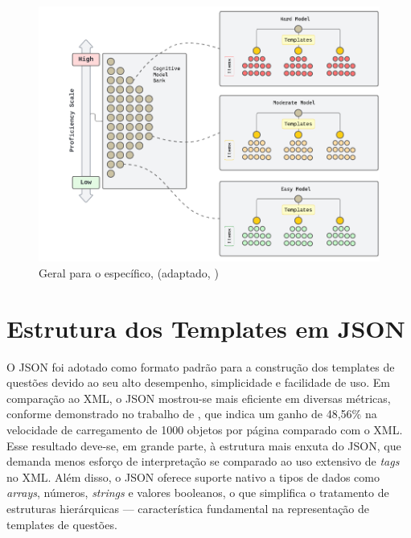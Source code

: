\begin{figure}[ht]
	\centering
	\includegraphics[width=14cm]{./imagens/capitulo5/proficiency-scale-named}
	\caption{Geral para o específico, (adaptado, \cite{hendrickson2010}) }
	\label{fig:proficiency-scale}
\end{figure}

\section{Estrutura dos Templates em JSON}

O JSON foi adotado como formato padrão para a construção dos templates de questões devido ao seu alto desempenho, simplicidade e facilidade de uso. Em comparação ao XML, o JSON mostrou-se mais eficiente em diversas métricas, conforme demonstrado no trabalho de \parencite{wang2011}, que indica um ganho de  48,56\% na velocidade de carregamento de 1000 objetos por página comparado com o XML. Esse resultado deve-se, em grande parte, à estrutura mais enxuta do JSON, que demanda menos esforço de interpretação se comparado ao uso extensivo de \textit{tags} no XML.  Além disso, o JSON oferece suporte nativo a tipos de dados como \textit{arrays}, números, \textit{strings} e valores booleanos, o que simplifica o tratamento de estruturas hierárquicas — característica fundamental na representação de templates de questões.

